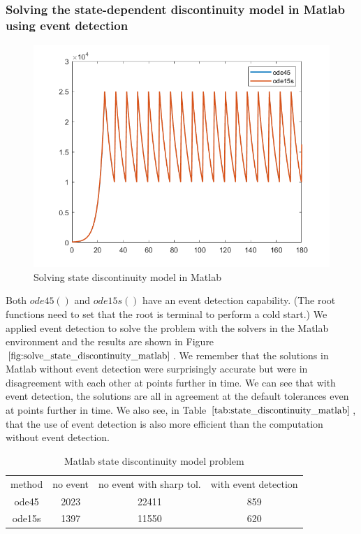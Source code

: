 \subsubsection{Solving the state-dependent discontinuity model in Matlab using event detection}
\begin{figure}[H]
\centering
\includegraphics[width=0.7\linewidth]{./figures/solve_state_discontinuity_matlab}
\caption{Solving state discontinuity model in Matlab}
\label{fig:solve_state_discontinuity_matlab}
\end{figure}
Both $ode45()$ and $ode15s()$ have an event detection capability. (The root functions need to set that the root is terminal to perform a cold start.) We applied event detection to solve the problem with the solvers in the Matlab environment and the results are shown in Figure $\ref{fig:solve_state_discontinuity_matlab}$. We remember that the solutions in Matlab without event detection were surprisingly accurate but were in disagreement with each other at points further in time. We can see that with event detection, the solutions are all in agreement at the default tolerances even at points further in time. We also see, in Table $\ref{tab:state_discontinuity_matlab}$, that the use of event detection is also more efficient than the computation without event detection.

\begin{table}[h]
\caption {Matlab state discontinuity model problem} \label{tab:state_discontinuity_matlab}
\begin{center}
\begin{tabular}{ c c c c } 
method & no event & no event with sharp tol. & with event detection \\ 
ode45 & 2023 & 22411 & 859 \\
ode15s & 1397 & 11550 & 620 \\
\end{tabular}
\end{center}
\end{table}

